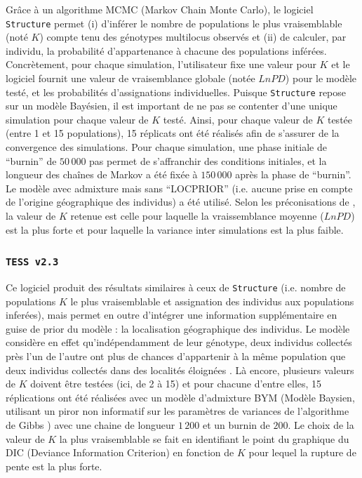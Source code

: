 \documentclass[a4paper,12pt,twoside]{article}\usepackage[]{graphicx}\usepackage[]{color}
\begin{document}
\begin {bibunit} [newbst]
Grâce à un algorithme MCMC (Markov Chain Monte Carlo), le logiciel \texttt{Structure} permet (i) d'inférer le nombre de populations le plus vraisemblable (noté $K$) compte tenu des génotypes multilocus observés et (ii) de calculer, par individu, la probabilité d'appartenance à chacune des populations inférées. Concrètement, pour chaque simulation, l'utilisateur fixe une valeur pour $K$ et le logiciel fournit une valeur de vraisemblance globale (notée $LnPD$) pour le modèle testé, et les probabilités d'assignations individuelles. Puisque \texttt{Structure} repose sur un modèle Bayésien, il est important de ne pas se contenter d'une unique simulation pour chaque valeur de $K$ testé. Ainsi, pour chaque valeur de $K$ testée (entre 1 et 15 populations), 15 réplicats ont été réalisés afin de s'assurer de la convergence des simulations. Pour chaque simulation, une phase initiale de ``burnin'' de $50\,000$ pas permet de s'affranchir des conditions initiales, et la longueur des chaînes de Markov a été fixée à $150\,000$ après la phase de ``burnin''. Le modèle avec admixture mais sans ``LOCPRIOR'' (i.e. aucune prise en compte de l'origine géographique des individus) a été utilisé. Selon les préconisations de \citet{pritchard2000}, la valeur de $K$ retenue est celle pour laquelle la vraissemblance moyenne ($LnPD$) est la plus forte et pour laquelle la variance inter simulations est la plus faible.

\subsubsection*{\texttt{TESS~v2.3} \citep{durand2009}}

Ce logiciel produit des résultats similaires à ceux de \texttt{Structure} (i.e. nombre de populations $K$ le plus vraisemblable et assignation des individus aux populations inferées), mais permet en outre d'intégrer une information supplémentaire en guise de prior du modèle : la localisation géographique des individus. Le modèle considère en effet qu'indépendamment de leur génotype, deux individus collectés près l'un de l'autre ont plus de chances d'appartenir à la même population que deux individus collectés dans des localités éloignées \citep{durand2009}. Là encore, plusieurs valeurs de $K$ doivent être testées (ici, de 2 à 15) et pour chacune d'entre elles, 15 réplications ont été réalisées avec un modèle d'admixture BYM (Modèle Baysien, utilisant un piror non informatif sur les paramètres de variances de l'algorithme de Gibbs \cite{durand2009}) avec une chaine de longueur $1\,200$ et un burnin de $200$. Le choix de la valeur de $K$ la plus vraisemblable se fait en identifiant le point du graphique du DIC (Deviance Information Criterion) en fonction de $K$ pour lequel la rupture de pente est la plus forte.


\end{bibunit}
\end{document}
